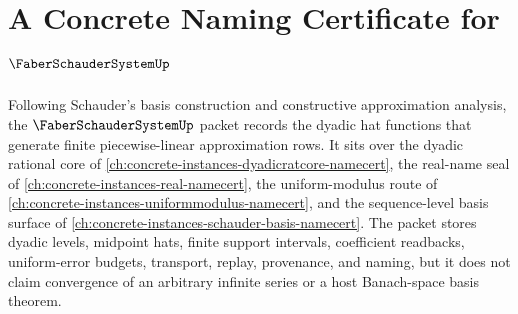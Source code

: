 \chapter{A Concrete Naming Certificate for $\FaberSchauderSystemUp$}
\label{ch:concrete-instances-faber-schauder-system-namecert}

Following Schauder's basis construction and constructive approximation analysis, the $\FaberSchauderSystemUp$ packet records the dyadic hat functions that generate finite piecewise-linear approximation rows. It sits over the dyadic rational core of \autoref{ch:concrete-instances-dyadicratcore-namecert}, the real-name seal of \autoref{ch:concrete-instances-real-namecert}, the uniform-modulus route of \autoref{ch:concrete-instances-uniformmodulus-namecert}, and the sequence-level basis surface of \autoref{ch:concrete-instances-schauder-basis-namecert}. The packet stores dyadic levels, midpoint hats, finite support intervals, coefficient readbacks, uniform-error budgets, transport, replay, provenance, and naming, but it does not claim convergence of an arbitrary infinite series or a host Banach-space basis theorem.

